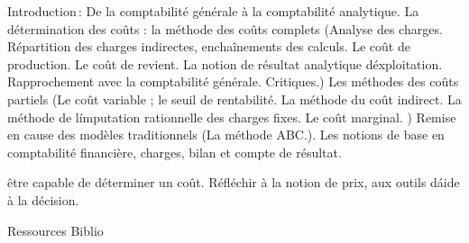 \vfill

{
Introduction\,: De la comptabilité générale à la comptabilité analytique. La détermination des coûts :
la méthode des coûts complets (Analyse des charges. Répartition des charges indirectes, enchaînements des calculs. Le coût de production.
Le coût de revient. La notion de résultat analytique d\'exploitation. Rapprochement avec la comptabilité générale. Critiques.)
Les méthodes des coûts partiels (Le coût variable ; le seuil de rentabilité. La méthode du coût indirect.
La méthode de l\'imputation rationnelle des charges fixes. Le coût marginal. ) Remise en cause des modèles traditionnels (La méthode ABC.).
} 
{Les notions de base en comptabilité financière, charges, bilan et compte de résultat.} 
{\begin{itemize}
 \ObjItem être capable de déterminer un coût. Réfléchir à la notion de prix, aux outils d\'aide à la décision.
\end{itemize} 
} 
{Ressources} 
{Biblio} 
 
\vfill

